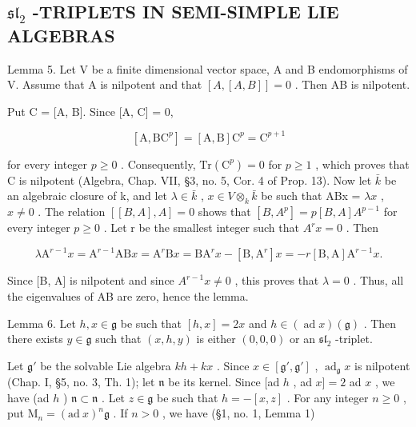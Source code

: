 \subsection{\texorpdfstring{\(\mathfrak{sl}_2\) -TRIPLETS IN SEMI-SIMPLE LIE ALGEBRAS}{\textbackslash mathfrak\{sl\}\_2 -TRIPLETS IN SEMI-SIMPLE LIE ALGEBRAS}}

Lemma 5. Let V be a finite dimensional vector space, A and B endomorphisms of V. Assume that A is nilpotent and that \([A, [A, B]] = 0\) . Then AB is nilpotent.

Put C = {[}A, B{]}. Since {[}A, C{]} = 0,

\[
[ \mathrm{A}, \mathrm{BC} ^ {p} ] = [ \mathrm{A}, \mathrm{B} ] \mathrm{C} ^ {p} = \mathrm{C} ^ {p + 1}
\]

for every integer \(p \geq 0\) . Consequently, \(\mathrm{Tr}(\mathrm{C}^{p}) = 0\) for \(p \geq 1\) , which proves that C is nilpotent (Algebra, Chap. VII, §3, no. 5, Cor. 4 of Prop. 13). Now let \(\bar{k}\) be an algebraic closure of k, and let \(\lambda \in \bar{k}\) , \(x \in V \otimes_{k} \bar{k}\) be such that ABx = \(\lambda x\) , \(x \neq 0\) . The relation \([[B, A], A] = 0\) shows that \([B, A^{p}] = p[B, A]A^{p-1}\) for every integer \(p \geq 0\) . Let r be the smallest integer such that \(A^{r}x = 0\) . Then

\[
\lambda \mathrm{A} ^ {r - 1} x = \mathrm{A} ^ {r - 1} \mathrm{AB} x = \mathrm{A} ^ {r} \mathrm{B} x = \mathrm{BA} ^ {r} x - [ \mathrm{B}, \mathrm{A} ^ {r} ] x = - r [ \mathrm{B}, \mathrm{A} ] \mathrm{A} ^ {r - 1} x.
\]

Since {[}B, A{]} is nilpotent and since \(A^{r-1}x \neq 0\) , this proves that \(\lambda = 0\) . Thus, all the eigenvalues of AB are zero, hence the lemma.

Lemma 6. Let \(h, x \in \mathfrak{g}\) be such that \([h, x] = 2x\) and \(h \in (\operatorname{ad} x)(\mathfrak{g})\) . Then there exists \(y \in \mathfrak{g}\) such that \((x, h, y)\) is either \((0, 0, 0)\) or an \(\mathfrak{sl}_2\) -triplet.

Let \(\mathfrak{g}'\) be the solvable Lie algebra \(kh + kx\) . Since \(x \in [\mathfrak{g}', \mathfrak{g}']\) , \(\operatorname{ad}_{\mathfrak{g}} x\) is nilpotent (Chap. I, §5, no. 3, Th. 1); let \(\mathfrak{n}\) be its kernel. Since {[}ad \(h\) , ad \(x] = 2\) ad \(x\) , we have (ad \(h\) ) \(\mathfrak{n} \subset \mathfrak{n}\) . Let \(z \in \mathfrak{g}\) be such that \(h = -[x, z]\) . For any integer \(n \geq 0\) , put \(\mathrm{M}_n = (\mathrm{ad}~x)^n\mathfrak{g}\) . If \(n > 0\) , we have (§1, no. 1, Lemma 1)

